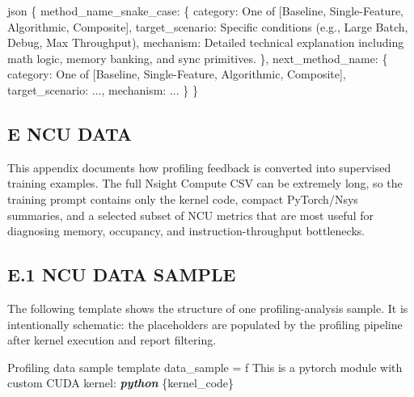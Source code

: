 \documentclass[
  10
]{article}
\newenvironment{Shaded}{}{}
\newcommand{\InformationTok}[1]{\textcolor[rgb]{0.38,0.63,0.69}{\textbf{\textit{#1}}}}
\newcommand{\NormalTok}[1]{#1}
\begin{document}
\begin{Shaded}
\begin{Highlighting}[]
\NormalTok{\textasciigrave{}\textasciigrave{}\textasciigrave{}json}
\NormalTok{\{}
\NormalTok{    \textquotesingle{}method\_name\_snake\_case\textquotesingle{}: \{}
\NormalTok{    \textquotesingle{}category\textquotesingle{}: \textquotesingle{}One of [Baseline, Single{-}Feature, Algorithmic, Composite]\textquotesingle{}, \textquotesingle{}target\_scenario\textquotesingle{}: \textquotesingle{}Specific conditions (e.g., \textquotesingle{}Large Batch\textquotesingle{}, \textquotesingle{}Debug\textquotesingle{}, \textquotesingle{}Max Throughput\textquotesingle{})\textquotesingle{},}
\NormalTok{    \textquotesingle{}mechanism\textquotesingle{}: \textquotesingle{}Detailed technical explanation including math logic, memory banking, and sync primitives.\textquotesingle{}}
\NormalTok{    \},}
\NormalTok{    \textquotesingle{}next\_method\_name\textquotesingle{}: \{}
\NormalTok{    \textquotesingle{}category\textquotesingle{}: \textquotesingle{}One of [Baseline, Single{-}Feature, Algorithmic, Composite]\textquotesingle{}, \textquotesingle{}target\_scenario\textquotesingle{}: \textquotesingle{}...\textquotesingle{},}
\NormalTok{    \textquotesingle{}mechanism\textquotesingle{}: \textquotesingle{}...\textquotesingle{}}
\NormalTok{    \}}
\NormalTok{\} }
\end{Highlighting}
\end{Shaded}

\subsection{E NCU DATA}\label{e-ncu-data}

This appendix documents how profiling feedback is converted into
supervised training examples. The full Nsight Compute CSV can be
extremely long, so the training prompt contains only the kernel code,
compact PyTorch/Nsys summaries, and a selected subset of NCU metrics
that are most useful for diagnosing memory, occupancy, and
instruction-throughput bottlenecks.

\subsection{E.1 NCU DATA SAMPLE}\label{e.1-ncu-data-sample}

The following template shows the structure of one profiling-analysis
sample. It is intentionally schematic: the placeholders are populated by
the profiling pipeline after kernel execution and report filtering.

\begin{Shaded}
\begin{Highlighting}[]
\NormalTok{Profiling data sample template}
\NormalTok{data\_sample = f\textquotesingle{}\textquotesingle{}\textquotesingle{}}
\NormalTok{This is a pytorch module with custom CUDA kernel:}
\InformationTok{\textasciigrave{}\textasciigrave{}\textasciigrave{}python}
\NormalTok{\{kernel\_code\}}
\end{Highlighting}
\end{Shaded}
\end{document}
